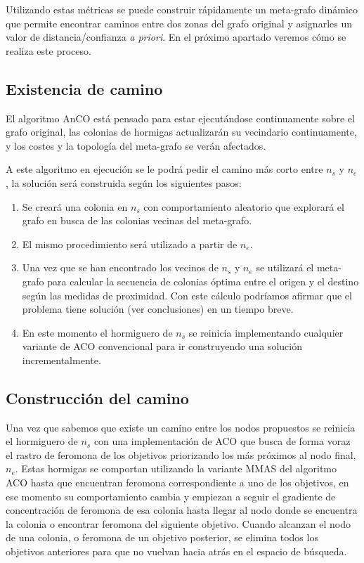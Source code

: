 \documentclass{llncs}
\begin{document}
Utilizando estas métricas se puede construir rápidamente un meta-grafo dinámico que permite encontrar caminos entre dos zonas del grafo original y asignarles un valor de distancia/confianza \textit{a priori}.
En el próximo apartado veremos cómo se realiza este proceso.

\subsection{Existencia de camino}
El algoritmo AnCO está pensado para estar ejecutándose continuamente sobre el grafo original, las colonias de hormigas actualizarán su vecindario continuamente, y los costes y la topología del meta-grafo se verán afectados.

A este algoritmo en ejecución se le podrá pedir el camino más corto entre $n_s$ y $n_e$, la solución será construida según los siguientes pasos:

\begin{enumerate}
  \item Se creará una colonia en $n_s$ con comportamiento aleatorio que explorará el grafo en busca de las colonias vecinas del meta-grafo.
  \item El mismo procedimiento será utilizado a partir de $n_e$.
  \item Una vez que se han encontrado los vecinos de $n_s$ y $n_e$ se utilizará el meta-grafo para calcular la secuencia de colonias óptima entre el origen y el destino según las medidas de proximidad. Con este cálculo podríamos afirmar que el problema tiene solución (ver conclusiones) en un tiempo breve.
  \item En este momento el hormiguero de $n_s$ se reinicia implementando cualquier variante de ACO convencional para ir construyendo una solución incrementalmente.
\end{enumerate}

\subsection{Construcción del camino}
Una vez que sabemos que existe un camino entre los nodos propuestos se reinicia el hormiguero de $n_s$ con una implementación de ACO que busca de forma voraz el rastro de feromona de los objetivos priorizando los más próximos al nodo final, $n_e$.
Estas hormigas se comportan utilizando la variante MMAS del algoritmo ACO hasta que encuentran feromona correspondiente a uno de los objetivos, en ese momento su comportamiento cambia y empiezan a seguir el gradiente de concentración de feromona de esa colonia hasta llegar al nodo donde se encuentra la colonia o encontrar feromona del siguiente objetivo.
Cuando alcanzan el nodo de una colonia, o feromona de un objetivo posterior, se elimina todos los objetivos anteriores para que no vuelvan hacia atrás en el espacio de búsqueda.
\end{document}
